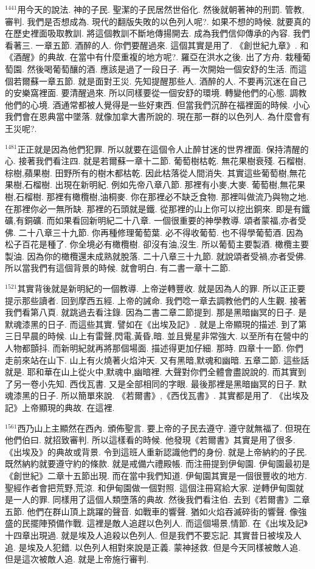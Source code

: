 \documentclass{book}
\begin{document}
$^{1441}$用今天的說法.
神的子民.
聖潔的子民居然世俗化.
然後就朝著神的刑罰.
管教,審判.
我們是否想成為.
現代的翻版失敗的以色列人呢?.
如果不想的時候.
就要真的在歷史裡面吸取教訓.
將這個教訓不斷地傳揚開去.
成為我們信仰傳承的內容.
我們看著三.
一章五節.
酒醉的人.
你們要醒過來.
這個其實是用了.
《創世紀九章》.
和《酒醒》的典故.
在當中有什麼重複的地方呢?.
羅亞在洪水之後.
出了方舟.
栽種葡萄園.
然後喝葡萄釀的酒.
應該是過了一段日子.
再一次開始一個安舒的生活.
而這個若爾蘇一章五節.
就是面對王災.
先知提醒那些人.
酒醉的人.
不要再沉迷在自己的安樂窩裡面.
要清醒過來.
所以同樣要從一個安舒的環境.
轉變他們的心態.
調教他們的心境.
酒通常都被人覺得是一些好東西.
但當我們沉醉在福裡面的時候.
小心我們會在恩典當中墜落.
就像加拿大書所說的.
現在那一群的以色列人.
為什麼會有王災呢?.

$^{1481}$正正就是因為他們犯罪.
所以就要在這個令人止醉甘迷的世界裡面.
保持清醒的心.
接著我們看注四.
就是若爾蘇一章十二節.
葡萄樹枯乾.
無花果樹衰殘.
石榴樹,棕樹,蘋果樹.
田野所有的樹木都枯乾.
因此枯落從人間消失.
其實這些葡萄樹,無花果樹,石榴樹.
出現在新明紀.
例如先帝八章八節.
那裡有小麥,大麥.
葡萄樹,無花果樹,石榴樹.
那裡有橄欖樹,油桐麥.
你在那裡必不缺乏食物.
那裡叫做流乃與物之地.
在那裡你必一無所缺.
那裡的石頭就是鐵.
從那裡的山上你可以挖出銅來.
即是有鐵礦,有銅礦.
而如果看回新明紀二十八章.
一個很重要的神學教導.
頌者蒙福,亦者受佛.
二十八章三十九節.
你再種修理葡萄葉.
必不得收葡萄.
也不得學葡萄酒.
因為松子百花是種了.
你全境必有橄欖樹.
卻沒有油,沒生.
所以葡萄主要製酒.
橄欖主要製油.
因為你的橄欖還未成熟就脫落.
二十八章三十九節.
就說頌者受禍,亦者受佛.
所以當我們有這個背景的時候.
就會明白.
有二書一章十二節.

$^{1521}$其實背後就是新明紀的一個教導.
上帝逆轉豐收.
就是因為人的罪.
所以正正要提示那些讀者.
回到摩西五經.
上帝的誡命.
我們唸一章去調教他們的人生觀.
接著我們看第八頁.
就跳過去看注錄.
因為二書二章二節提到.
那是黑暗幽冥的日子.
是默魂漆黑的日子.
而這些其實.
譬如在《出埃及記》.
就是上帝顯現的描述.
到了第三日早晨的時候.
山上有雷聲,閃電,黃昏,暗.
並且覺星非常強大.
以至所有在營中的人物都顫抖.
而新明紀就再將那個場面.
描述得更加仔細.
那時.
四章十一節.
你們走前來站在山下.
山上有火燒著火焰沖天.
又有黑暗,默魂和幽暗.
五章二節.
這些話就是.
耶和華在山上從火中,默魂中,幽暗裡.
大聲對你們全體會盡說說的.
而其實到了另一卷小先知.
西伐瓦書.
又是全部相同的字眼.
最後那裡是黑暗幽冥的日子.
默魂漆黑的日子.
所以簡單來說.
《若爾書》,《西伐瓦書》.
其實都是用了.
《出埃及記》上帝顯現的典故.
在這裡.

$^{1561}$西乃山上主顯然在西內.
頒佈聖言.
要上帝的子民去遵守.
遵守就無福了.
但現在他們伯曰.
就招致審判.
所以這樣看的時候.
他發現《若爾書》其實是用了很多.
《出埃及》的典故或背景.
令到這班人重新認識他們的身份.
就是上帝納約的子民.
既然納約就要遵守約的條款.
就是戒備六禮殿帳.
而注冊提到伊甸園.
伊甸園最初是《創世紀》二章十五節出現.
而在當中我們知道.
伊甸園其實是一個很豐收的地方.
聖經作者會把荒野,荒涼.
和伊甸園做一個對照.
這個注冊寫給大家.
逆轉伊甸園就是一人的罪.
同樣用了這個人類墮落的典故.
然後我們看注伯.
去到《若爾書》二章五節.
他們在群山頂上跳躍的聲音.
如戰車的響聲.
猶如火焰吞滅碎街的響聲.
像強盛的民擺陣預備作戰.
這裡是敵人追趕以色列人.
而這個場景,情節.
在《出埃及記》十四章出現過.
就是埃及人追殺以色列人.
但是我們不要忘記.
其實昔日被埃及人追.
是埃及人犯錯.
以色列人相對來說是正義.
蒙神拯救.
但是今天同樣被敵人追.
但是這次被敵人追.
就是上帝施行審判.
\end{document}
